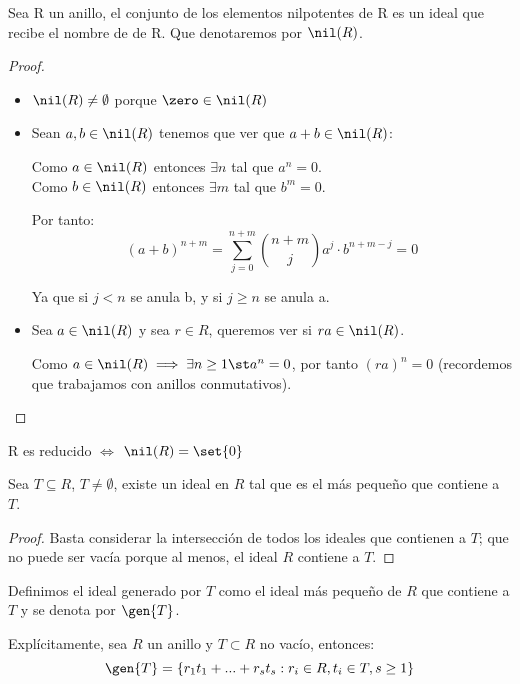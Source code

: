 \begin{lemma}
 Sea R un anillo, el conjunto de los elementos nilpotentes de R es un ideal que recibe el nombre de  de R. Que denotaremos por $\nil(R)$.
\end{lemma}
\begin{proof}
	\begin{itemize}
		\item $\nil(R) \neq \emptyset$ porque $\zero \in \nil(R)$
		\item Sean $a,b \in \nil(R)$ tenemos que ver que $a+b \in \nil(R)$:

		Como $a \in \nil(R)$ entonces $\exists n$ tal que $a^n=0$.\\
		Como $b \in \nil(R)$ entonces $\exists m$ tal que $b^m=0$.

		Por tanto:
		$$(a+b)^{n+m} = \sum_{j=0}^{n+m} \binom{n+m}{j} a^j \cdot b^{n+m-j} = 0$$

		Ya que si $j<n$ se anula b, y si $j \geq n$ se anula a.
		\item Sea $a \in \nil(R)$ y sea $r\in R$, queremos ver si $ra \in \nil(R)$.

		Como $a\in \nil(R) \implies \exists n \geq 1 \st a^n=0$, por tanto $(ra)^n = 0$ (recordemos que trabajamos con anillos conmutativos).
	\end{itemize}
\end{proof}

\begin{prop}
	R es reducido $\Leftrightarrow$ $\nil(R)=\set{0}$
\end{prop}


\begin{prop}
	Sea $T \subseteq R$, $T \neq \emptyset$, existe un ideal en $R$ tal que es el más pequeño que contiene a $T$.
\end{prop}
\begin{proof}
	Basta considerar la intersección de todos los ideales que contienen a $T$; que no puede ser vacía porque al menos, el ideal $R$ contiene a $T$.
\end{proof}

\begin{defn}
Definimos el ideal generado por $T$ como el ideal más pequeño de $R$ que contiene a $T$ y se denota por $\gen{T}$.

Explícitamente, sea $R$ un anillo y $T \subset R$ no vacío, entonces:
$$ \gen{T} = \{r_1t_1+...+r_st_s: r_i \in R, t_i \in T, s \geq 1 \} $$
\end{defn}

